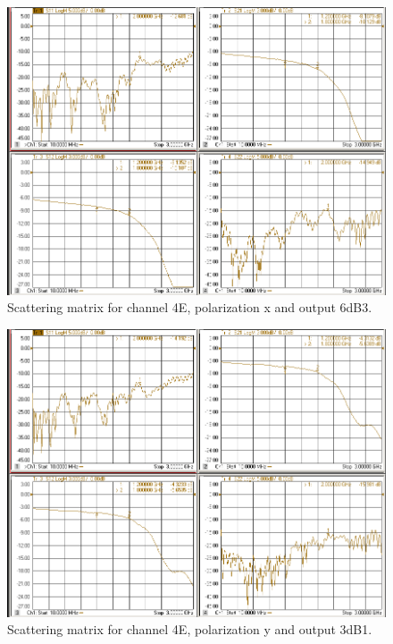 \documentclass[12pt,a4paper,oneside]{article}
\begin{document}
\begin{figure}[H]
\centering
\includegraphics[width=0.9\linewidth]{VNA_results/4Ex_6dB3.png}
\caption{Scattering matrix for channel 4E, polarization x and output 6dB3.}
\label{fig:4Ex_6dB3}
\end{figure}


\begin{figure}[H]
\centering
\includegraphics[width=0.9\linewidth]{VNA_results/4Ey_3dB1.png}
\caption{Scattering matrix for channel 4E, polarization y and output 3dB1.}
\label{fig:4Ey_3dB1}
\end{figure}
\end{document}
